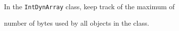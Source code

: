 In the \texttt{IntDynArray} class, keep track of the maximum of

number of bytes used by all objects in the class.

